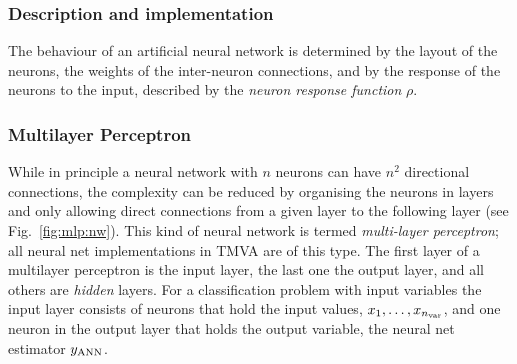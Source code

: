 \subsubsection{Description and implementation}
\label{sec:mlp:impl}

The behaviour of an artificial neural network is determined by the layout of
the neurons, the weights of the inter-neuron connections, and by the
response of the neurons to the input, described by the {\em neuron
  response function} $\rho$.

\subsubsection*{Multilayer Perceptron}

While in principle a neural network with $n$ neurons can have $n^2$
directional connections, the complexity can be reduced by organising the
neurons in layers and only allowing direct connections from a given layer 
to the following layer (see Fig.~\ref{fig:mlp:nw}). This kind of
neural network is termed {\em multi-layer perceptron}; all neural net
implementations in TMVA are of this type. The first layer of a multilayer perceptron 
is the input layer, the last one the output layer, and all others are 
{\em hidden} layers.  For a classification problem with \Nvar input
variables the input layer consists of \Nvar
neurons that hold the input values, $x_1,\dots,x_{n_\text{var}}$, and one
neuron in the output layer that holds the output variable, the neural
net estimator $ y_{\rm ANN}$.

